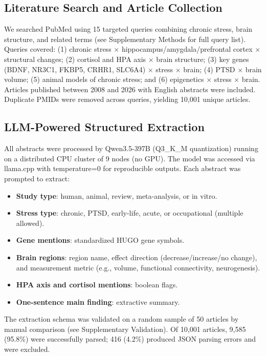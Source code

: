 \documentclass[12pt,a4paper]{article}
\begin{document}
\subsection{Literature Search and Article Collection}

We searched PubMed using 15 targeted queries combining chronic stress, brain structure, and related terms (see Supplementary Methods for full query list). Queries covered: (1) chronic stress $\times$ hippocampus/amygdala/prefrontal cortex $\times$ structural changes; (2) cortisol and HPA axis $\times$ brain structure; (3) key genes (BDNF, NR3C1, FKBP5, CRHR1, SLC6A4) $\times$ stress $\times$ brain; (4) PTSD $\times$ brain volume; (5) animal models of chronic stress; and (6) epigenetics $\times$ stress $\times$ brain. Articles published between 2008 and 2026 with English abstracts were included. Duplicate PMIDs were removed across queries, yielding 10,001 unique articles.

\subsection{LLM-Powered Structured Extraction}

All abstracts were processed by Qwen3.5-397B (Q3\_K\_M quantization) running on a distributed CPU cluster of 9 nodes (no GPU). The model was accessed via llama.cpp with temperature=0 for reproducible outputs. Each abstract was prompted to extract:

\begin{itemize}
    \item \textbf{Study type}: human, animal, review, meta-analysis, or in vitro.
    \item \textbf{Stress type}: chronic, PTSD, early-life, acute, or occupational (multiple allowed).
    \item \textbf{Gene mentions}: standardized HUGO gene symbols.
    \item \textbf{Brain regions}: region name, effect direction (decrease/increase/no change), and measurement metric (e.g., volume, functional connectivity, neurogenesis).
    \item \textbf{HPA axis and cortisol mentions}: boolean flags.
    \item \textbf{One-sentence main finding}: extractive summary.
\end{itemize}

The extraction schema was validated on a random sample of 50 articles by manual comparison (see Supplementary Validation). Of 10,001 articles, 9,585 (95.8\%) were successfully parsed; 416 (4.2\%) produced JSON parsing errors and were excluded.
\end{document}
